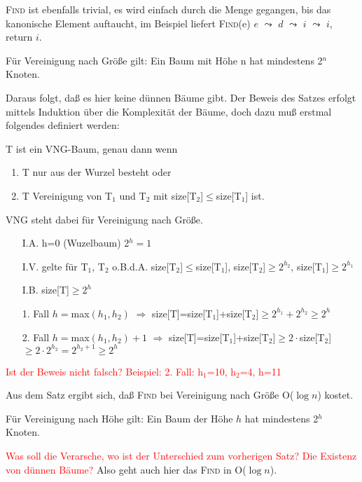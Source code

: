 \textsc{Find} ist ebenfalls trivial, es wird einfach durch die Menge gegangen, bis das kanonische Element auftaucht, im
Beispiel liefert \textsc{Find}(e) $e$ $\leadsto$ $d$ $\leadsto$ $i$ $\leadsto$ $i$, return $i$.

\begin{satz}
Für Vereinigung nach Größe gilt: Ein Baum mit Höhe n hat mindestens 2$^n$ Knoten. 
\end{satz}
Daraus folgt, daß es hier keine dünnen Bäume gibt. Der Beweis des Satzes erfolgt mittels Induktion über die
Komplexität der Bäume, doch dazu muß erstmal folgendes definiert werden:
 
\begin{definition}
T ist ein VNG-Baum, genau dann wenn
\begin{enumerate}
\item T nur aus der Wurzel besteht oder
\item T Vereinigung von T$_1$ und T$_2$ mit size[T$_2$]$\leq$size[T$_1$] ist.
\end{enumerate}
\end{definition}
VNG steht dabei für Vereinigung nach Größe.

\begin{beweis}
\begin{itemize}
\item[I.A.] h=0 (Wuzelbaum) 2$^h=1$
\item[I.V.] gelte für T$_1$, T$_2$ o.B.d.A. size[T$_2$]$\leq$size[T$_1$], size[T$_2$]$\geq 2^{h_2}$, size[T$_1$]$\geq
2^{h_1}$
\item[I.B.] size[T]$\geq 2^h$
\item[1. Fall] $h=$max$(h_1, h_2)$ $\Rightarrow$ size[T]=size[T$_1$]+size[T$_2$]$\geq 2^{h_1}+2^{h_2} \geq 2^h$
\item[2. Fall] $h=$max$(h_1, h_2)+1$ $\Rightarrow$ size[T]=size[T$_1$]+size[T$_2$]$\geq 2 \cdot $size[T$_2$]$\geq 2
\cdot 2^{h_2} =2^{h_2+1} \geq 2^h$
\end{itemize}
\end{beweis}

\textcolor{red}{Ist der Beweis nicht falsch? Beispiel: 2. Fall: h$_1$=10, h$_2$=4, h=11}

Aus dem Satz ergibt sich, daß \textsc{Find} bei Vereinigung nach Größe O($\log n$) kostet.

\begin{satz}
Für Vereinigung nach Höhe gilt: Ein Baum der Höhe $h$ hat mindestens 2$^h$ Knoten.
\end{satz}
\textcolor{red}{Was soll die Verarsche, wo ist der Unterschied zum vorherigen Satz? Die Existenz von dünnen Bäume?}
Also geht auch hier das \textsc{Find} in O($\log n$).

